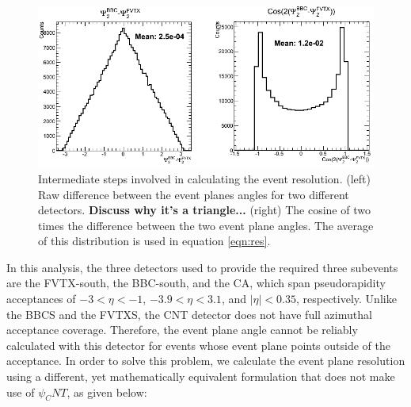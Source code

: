 \begin{figure}[!h]
\begin{center}
\includegraphics[width=0.85\linewidth]{figs/resolution_intermediate_calc.png}
\caption{Intermediate steps involved in calculating the event resolution. (left) Raw difference between the event planes angles for two different detectors. \textbf{Discuss why it's a triangle...} (right)  The cosine of two times the difference between the two event plane angles. The average of this distribution is used in equation \ref{eqn:res}.}
\label{fig:fvtx_ew_default}
\end{center}
\end{figure}

In this analysis, the three detectors used to provide the required three subevents are the FVTX-south, the BBC-south, and the CA, which span pseudorapidity acceptances of $-3 <\eta < -1$, $-3.9 < \eta < 3.1$, and $|\eta| < 0.35$, respectively. 
Unlike the BBCS and the FVTXS, the CNT detector does not have full azimuthal acceptance coverage. Therefore, the event plane angle cannot be reliably calculated with this detector for events whose event plane points outside of the acceptance. In order to solve this problem, we calculate the event plane resolution using a different, yet mathematically equivalent formulation that does not make use of $\psi_CNT$, as given below:

